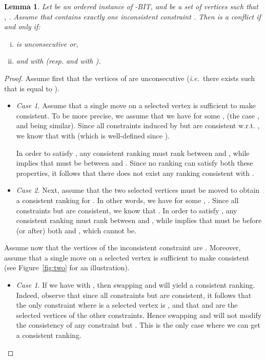 \documentclass[11pt]{article}
\newtheorem{lemma}[theorem]{Lemma}
\def\ie{{\em i.e.}~}
\begin{document}
\begin{lemma}
\label{claim:rBITconflict}
	Let  be an ordered instance of -BIT, and  be a set of  vertices such that , . Assume that  contains exactly one inconsistent constraint . Then  is a conflict if and only if:
	\begin{enumerate}[(i)]
		 \item  is unconsecutive or, 
		 \item   and  with  (resp.  and  with ). 
	\end{enumerate}
\end{lemma}

\begin{proof}
	Assume first that the vertices of  are unconsecutive (\ie there exists  such that  is equal to ). 
	
	\begin{itemize}
	
		\item \emph{Case 1.} Assume that a single move on a selected vertex is sufficient to make  consistent. To be more precise, we assume that we have  for some ,  (the case , 
		 and  being similar). Since all constraints induced by  but  are consistent w.r.t. , we know that  with   (which is well-defined since ).

In order to satisfy , any consistent ranking  must rank  between  and , while  implies that  must be between  and . Since no ranking can satisfy both these properties, it follows that there does not exist any ranking consistent with .

	\item \emph{Case 2.} Next, assume that the two selected vertices must be moved to obtain a consistent ranking for . In other words, we have  for some , . Since all constraints but  are consistent, we know that . In 
	order to satisfy , any 
	consistent ranking must rank  between  and , while 
	 implies that  must be before (or after) both 
	 and , which cannot be. 

\end{itemize}

	Assume now that the vertices of the inconsistent constraint  are . Moreover, assume that a single move on a selected vertex is sufficient to make  consistent (see Figure~\ref{fig:two} for an illustration). 
	
	\begin{itemize}
	
	\item \emph{Case 1.} If we have  with , then swapping  and  will yield a consistent ranking. Indeed, observe that since all constraints but  are consistent, it follows that the only constraint where  is a selected vertex is , and that  and  are the selected vertices of the other constraints. Hence swapping  and  will not modify the consistency of any constraint but . This is the only case where we can get a consistent ranking. 
	

\end{itemize}
\end{proof}
\end{document}
